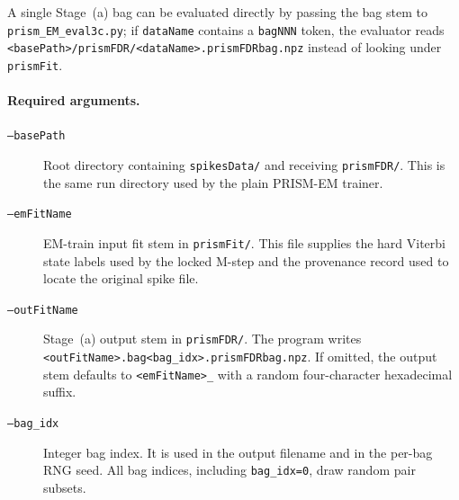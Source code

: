 \documentclass[11pt]{article}
\begin{document}
A single Stage~(a) bag can be evaluated directly by passing the bag stem to
\texttt{prism\_EM\_eval3c.py}; if \texttt{dataName} contains a
\texttt{bagNNN} token, the evaluator reads
\texttt{<basePath>/prismFDR/<dataName>.prismFDRbag.npz} instead of looking
under \texttt{prismFit}.

\paragraph{Required arguments.}
\begin{description}
  \item[\texttt{--basePath}] Root directory containing \texttt{spikesData/}
  and receiving \texttt{prismFDR/}. This is the same run directory used by
  the plain PRISM-EM trainer.
  \item[\texttt{--emFitName}] EM-train input fit stem in \texttt{prismFit/}.
  This file supplies the hard Viterbi state labels used by the locked
  M-step and the provenance record used to locate the original spike file.
  \item[\texttt{--outFitName}] Stage~(a) output stem in \texttt{prismFDR/}.
  The program writes
  \texttt{<outFitName>.bag<bag\_idx>.prismFDRbag.npz}. If omitted, the
  output stem defaults to \texttt{<emFitName>\_<hash4>} with a random
  four-character hexadecimal suffix.
  \item[\texttt{--bag\_idx}] Integer bag index. It is used in the output
  filename and in the per-bag RNG seed. All bag indices, including
  \texttt{bag\_idx=0}, draw random pair subsets.
\end{description}
\end{document}
